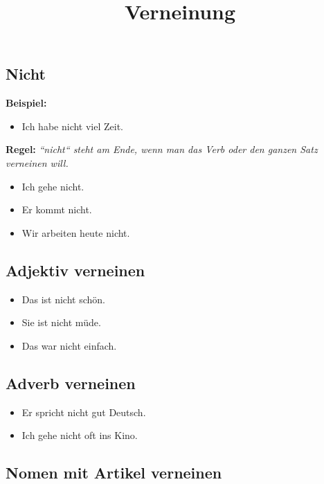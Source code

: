 \documentclass[a4paper]{article}
\title{Verneinung}
\date{}
\begin{document}
    \maketitle
    
    \subsection{Nicht}
        
        \textbf{Beispiel:}
        \begin{itemize}
            \item Ich habe nicht viel Zeit.
        \end{itemize}
        
        \textbf{Regel:}
        \emph{``nicht`` steht am Ende, wenn man das Verb oder den ganzen Satz verneinen will.}
        
        \begin{itemize}
            \item Ich gehe nicht.
            \item Er kommt nicht.
            \item Wir arbeiten heute nicht.
        \end{itemize}
    
    \subsection{Adjektiv verneinen}
        
        \begin{itemize}
            \item Das ist nicht schön.
            \item Sie ist nicht müde.
            \item Das war nicht einfach.
        \end{itemize}
    
    \subsection{Adverb verneinen}
        
        \begin{itemize}
            \item Er spricht nicht gut Deutsch.
            \item Ich gehe nicht oft ins Kino.
        \end{itemize}
    
    \subsection{Nomen mit Artikel verneinen}
        
\end{document}
